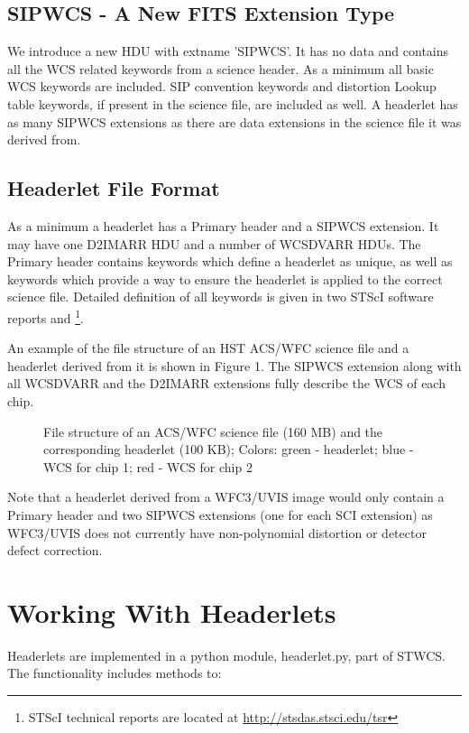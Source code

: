 \subsection{SIPWCS - A New FITS Extension Type}
We introduce a new HDU with extname 'SIPWCS'. It has no data and contains 
all the WCS related keywords from a science header.
As a minimum all basic WCS keywords \citep{greisen_2002} are included. SIP
convention keywords \citep{shupe_2005} and distortion Lookup table keywords, 
if present in the science file, are included as well. A headerlet has as
many SIPWCS extensions as there are data extensions in the science
file it was derived from. 

\subsection{Headerlet File Format}
As a minimum a headerlet has a Primary header
 and a SIPWCS extension. It may have one D2IMARR HDU and a number of
WCSDVARR HDUs. The Primary header contains keywords which define a headerlet as
unique, as well as keywords which provide a way to ensure the headerlet is 
applied to the correct science file. Detailed definition of all keywords is given in two STScI software reports \citet{hack_fc} and \citet{hack_hlet}\footnote{STScI technical reports are located at \url{http://stsdas.stsci.edu/tsr}}.

An example of the file structure of an HST ACS/WFC science
file and a headerlet derived from it is shown in Figure 1.
The SIPWCS extension along with all WCSDVARR and the D2IMARR extensions fully describe the WCS of each chip.

\begin{figure}[!h]
\caption{File structure of an ACS/WFC science file (160 MB) and the corresponding headerlet (100 KB); Colors: green - headerlet; blue - WCS for chip 1; red - WCS for chip 2}
\end{figure}

Note that a headerlet derived from a WFC3/UVIS image would only contain a 
Primary header and two SIPWCS extensions (one for each SCI extension) as
WFC3/UVIS does not currently have non-polynomial distortion or detector
defect correction.

\section{Working With Headerlets}
Headerlets are implemented in a python module, headerlet.py, part of STWCS. The functionality includes methods to:

